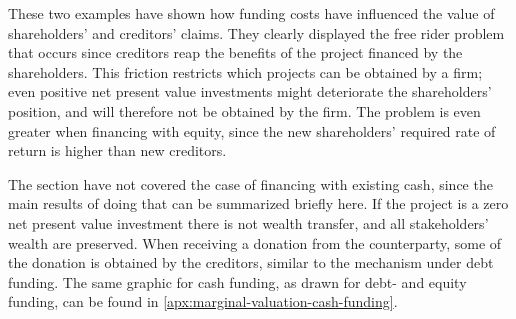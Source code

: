 \documentclass[main.tex]{subfiles}
\begin{document}
    These two examples have shown how funding costs have influenced 
    the value of shareholders' and creditors' claims.
    They clearly displayed the free rider problem that occurs
    since creditors reap the benefits of the project financed by the shareholders.
    This friction restricts which projects can be obtained by a firm;
    even positive net present value investments might deteriorate the shareholders' position,
    and will therefore not be obtained by the firm.
    The problem is even greater when financing with equity, 
    since the new shareholders' required rate of return is higher than new creditors.
    
    The section have not covered the case of financing with existing cash,
    since the main results of doing that can be summarized briefly here.
    If the project is a zero net present value investment there is not wealth transfer,
    and all stakeholders' wealth are preserved.
    When receiving a donation from the counterparty, 
    some of the donation is obtained by the creditors, similar to the mechanism under debt funding.
    The same graphic for cash funding, as drawn for debt- and equity funding, can be found in 
    \cref{apx:marginal-valuation-cash-funding}.
\end{document}
